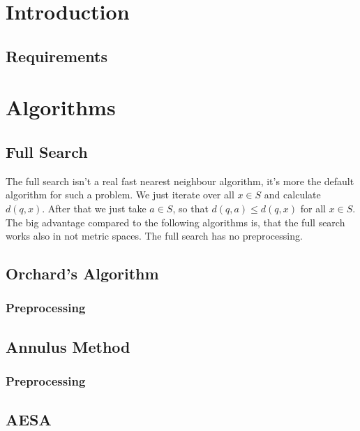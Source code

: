 \documentclass[runningheads,a4paper]{llncs}
\begin{document}
\tableofcontents

\newpage

\section{Introduction}

\subsection{Requirements}

\section{Algorithms}

\subsection{Full Search}

The full search isn't a real fast nearest neighbour algorithm, it's more the default algorithm for such a problem. We
just iterate over all $x \in S$ and calculate $d(q, x)$. After that we just take $a \in S$, so that
$d(q, a) \le d(q, x)$ for all $x \in S$. The big advantage compared to the following algorithms is, that the full search
works also in not metric spaces. The full search has no preprocessing.

\subsection{Orchard’s Algorithm}

\subsubsection{Preprocessing}

\subsection{Annulus Method}

\subsubsection{Preprocessing}

\subsection{AESA}
\end{document}
